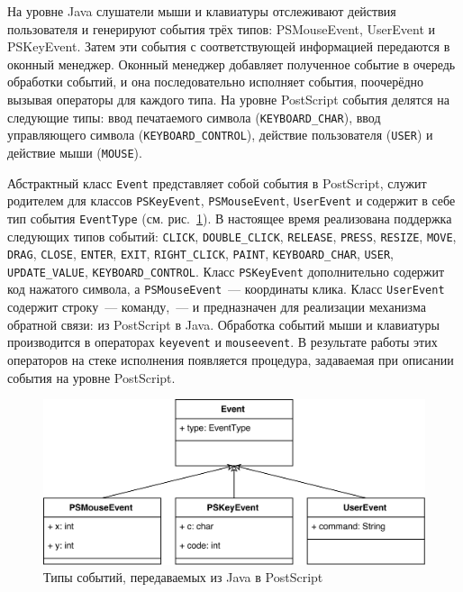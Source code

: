 
На уровне Java слушатели мыши и клавиатуры отслеживают действия пользователя и генерируют события трёх типов: PSMouseEvent, UserEvent и PSKeyEvent. Затем эти события с соответствующей информацией передаются в оконный менеджер. Оконный менеджер добавляет полученное событие в очередь обработки событий, и она последовательно исполняет события, поочерёдно вызывая операторы для каждого типа. На уровне PostScript события делятся на следующие типы: ввод печатаемого символа  (\texttt{KEYBOARD\_CHAR}), ввод управляющего символа (\texttt{KEYBOARD\_CONTROL}), действие пользователя (\texttt{USER}) и действие мыши (\texttt{MOUSE}).

Абстрактный класс \texttt{Event} представляет собой события в PostScript, служит родителем для классов \texttt{PSKeyEvent}, \texttt{PSMouseEvent}, \texttt{UserEvent} и содержит в себе тип события \texttt{EventType} (см. рис.~\ref{eventtype}). В настоящее время реализована поддержка следующих типов событий: \texttt{CLICK},  \texttt{DOUBLE\_CLICK},  \texttt{RELEASE},  \texttt{PRESS},  \texttt{RESIZE},  \texttt{MOVE},  \texttt{DRAG},  \texttt{CLOSE},  \texttt{ENTER},  \texttt{EXIT},  \texttt{RIGHT\_CLICK},  \texttt{PAINT},  \texttt{KEYBOARD\_CHAR},  \texttt{USER},  \texttt{UPDATE\_VALUE},  \texttt{KEYBOARD\_CONTROL}. Класс \texttt{PSKeyEvent} дополнительно содержит код нажатого символа, а \texttt{PSMouseEvent}~--- координаты клика. Класс \texttt{UserEvent} содержит строку~--- команду,~--- и предназначен для реализации механизма обратной связи: из PostScript в Java.  Обработка событий мыши и клавиатуры производится в операторах \texttt{keyevent} и \texttt{mouseevent}. В результате работы этих операторов на стеке исполнения появляется процедура, задаваемая при описании события на уровне PostScript.

\begin{figure}[h!]
\centering
\includegraphics[width=\textwidth]{Makulov/Events_from_Java.png}
\caption{Типы событий, передаваемых из Java в PostScript}
\label{eventtype}
\end{figure}


